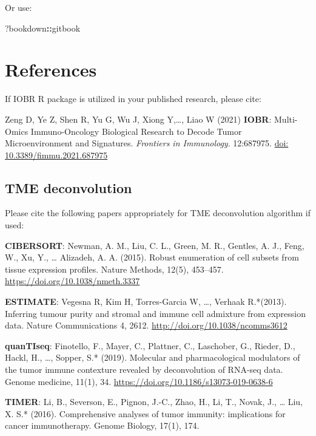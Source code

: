 \documentclass[
  12pt,
]{book}
\newenvironment{Shaded}{\begin{snugshade}}{\end{snugshade}}
\newcommand{\NormalTok}[1]{#1}
\newcommand{\SpecialCharTok}[1]{\textcolor[rgb]{0.81,0.36,0.00}{\textbf{#1}}}
\theoremstyle{definition}
\theoremstyle{definition}
\theoremstyle{definition}
\theoremstyle{definition}
\theoremstyle{remark}
\begin{document}
Or use:

\begin{Shaded}
\begin{Highlighting}[]
\NormalTok{?bookdown}\SpecialCharTok{::}\NormalTok{gitbook}
\end{Highlighting}
\end{Shaded}

\hypertarget{references}{%
\chapter{References}\label{references}}

If IOBR R package is utilized in your published research, please cite:

Zeng D, Ye Z, Shen R, Yu G, Wu J, Xiong Y,\ldots, Liao W (2021) \textbf{IOBR}: Multi-Omics Immuno-Oncology Biological Research to Decode Tumor Microenvironment and Signatures. \emph{Frontiers in Immunology}. 12:687975. \href{https://www.frontiersin.org/articles/10.3389/fimmu.2021.687975/full}{doi: 10.3389/fimmu.2021.687975}

\hypertarget{tme-deconvolution-1}{%
\section{TME deconvolution}\label{tme-deconvolution-1}}

Please cite the following papers appropriately for TME deconvolution algorithm if used:

\textbf{CIBERSORT}: Newman, A. M., Liu, C. L., Green, M. R., Gentles, A. J., Feng, W., Xu, Y., \ldots{} Alizadeh, A. A. (2015). Robust enumeration of cell subsets from tissue expression profiles. Nature Methods, 12(5), 453--457. \url{https://doi.org/10.1038/nmeth.3337}

\textbf{ESTIMATE}: Vegesna R, Kim H, Torres-Garcia W, \ldots, Verhaak R.*(2013). Inferring tumour purity and stromal and immune cell admixture from expression data. Nature Communications 4, 2612. \url{http://doi.org/10.1038/ncomms3612}

\textbf{quanTIseq}: Finotello, F., Mayer, C., Plattner, C., Laschober, G., Rieder, D., Hackl, H., \ldots, Sopper, S.* (2019). Molecular and pharmacological modulators of the tumor immune contexture revealed by deconvolution of RNA-seq data. Genome medicine, 11(1), 34. \url{https://doi.org/10.1186/s13073-019-0638-6}

\textbf{TIMER}: Li, B., Severson, E., Pignon, J.-C., Zhao, H., Li, T., Novak, J., \ldots{} Liu, X. S.* (2016). Comprehensive analyses of tumor immunity: implications for cancer immunotherapy. Genome Biology, 17(1), 174.
\end{document}
